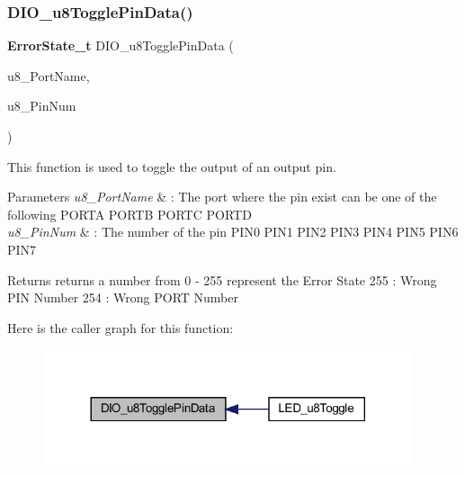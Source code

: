\subsubsection{D\+I\+O\+\_\+u8\+Toggle\+Pin\+Data()}
{\footnotesize\ttfamily \textbf{ Error\+State\+\_\+t} D\+I\+O\+\_\+u8\+Toggle\+Pin\+Data (\begin{DoxyParamCaption}\item[{\textbf{ D\+I\+O\+Port\+\_\+t}}]{u8\+\_\+\+Port\+Name,  }\item[{\textbf{ D\+I\+O\+Pin\+\_\+t}}]{u8\+\_\+\+Pin\+Num }\end{DoxyParamCaption})}



This function is used to toggle the output of an output pin. 


\begin{DoxyParams}{Parameters}
{\em u8\+\_\+\+Port\+Name} & \+: The port where the pin exist can be one of the following P\+O\+R\+TA P\+O\+R\+TB P\+O\+R\+TC P\+O\+R\+TD \\
\hline
{\em u8\+\_\+\+Pin\+Num} & \+: The number of the pin P\+I\+N0 P\+I\+N1 P\+I\+N2 P\+I\+N3 P\+I\+N4 P\+I\+N5 P\+I\+N6 P\+I\+N7 \\
\hline
\end{DoxyParams}
\begin{DoxyReturn}{Returns}
returns a number from 0 -\/ 255 represent the Error State 255 \+: Wrong P\+IN Number 254 \+: Wrong P\+O\+RT Number 
\end{DoxyReturn}
Here is the caller graph for this function\+:
\nopagebreak
\begin{figure}[H]
\begin{center}
\leavevmode
\includegraphics[width=308pt]{_d_i_o_8c_a8caffe2a4db322f3e6de4c4b55b9a842_icgraph}
\end{center}
\end{figure}
